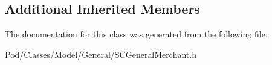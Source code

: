 \subsection*{Additional Inherited Members}


The documentation for this class was generated from the following file\+:\begin{DoxyCompactItemize}
\item 
Pod/\+Classes/\+Model/\+General/S\+C\+General\+Merchant.\+h\end{DoxyCompactItemize}

